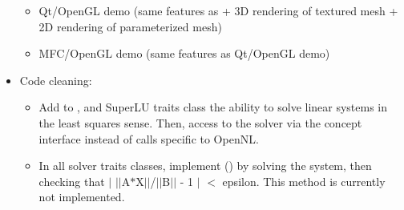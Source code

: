 \begin{itemize}
    \begin{itemize}

        \item Qt/OpenGL demo (same features as 
        + 3D rendering of textured mesh + 2D rendering of parameterized mesh)

        \item MFC/OpenGL demo (same features as Qt/OpenGL demo)

    \end{itemize}

\item Code cleaning:

    \begin{itemize}

    \item Add to , 
    and SuperLU traits class
    the ability to solve linear systems in the least squares sense. Then, access to
    the solver via the concept interface instead of calls specific to OpenNL.

    \item In all solver traits classes,
    implement () by solving the system, then checking that $|$ $|$$|$A$\ast$X$|$$|$/$|$$|$B$|$$|$ - 1 $|$ $<$ epsilon. This method is
    currently not implemented.

    \end{itemize}

\end{itemize}
